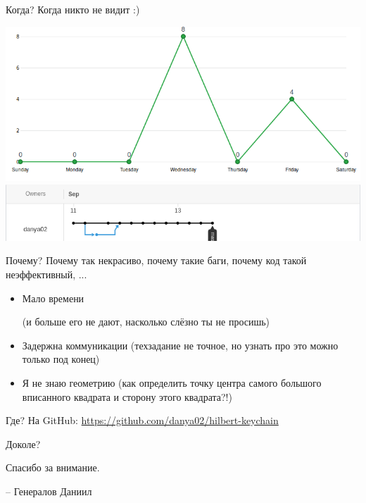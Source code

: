\documentclass[11pt]{beamer}
\begin{document}
\begin{frame}{Когда?}
Когда никто не видит :)

\includegraphics[scale=0.4]{code-graph}
\includegraphics[scale=0.4]{code-network}
\end{frame}

\begin{frame}{Почему?}
Почему так некрасиво, почему такие баги, почему код такой неэффективный, ...

\begin{itemize}
\item Мало времени \begin{small}(и больше его не дают, насколько слёзно ты не просишь)\end{small}
\item Задержна коммуникации (техзадание не точное, но узнать про это можно только под конец)
\item Я не знаю геометрию (как определить точку центра самого большого вписанного квадрата и сторону этого квадрата?!)
\end{itemize}
\end{frame}

\begin{frame}{Где?}
На GitHub: \underline{https://github.com/danya02/hilbert-keychain}

\end{frame}
\begin{frame}{Доколе?}
\begin{center}
\begin{Huge}
Спасибо за внимание.
\end{Huge}
\end{center}
\begin{flushright}
\begin{Large}
-- Генералов Даниил
\end{Large}
\end{flushright}
\begin{center}

\end{center}
\end{frame}
\end{document}
